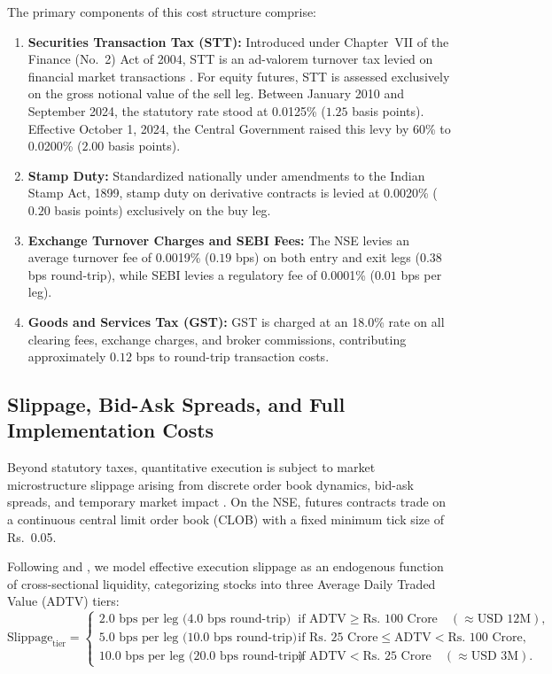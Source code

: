\documentclass[11pt,a4paper]{article}
\begin{document}
The primary components of this cost structure comprise:
\begin{enumerate}
    \item \textbf{Securities Transaction Tax (STT):} Introduced under Chapter~VII of the Finance (No.~2) Act of 2004, STT is an ad-valorem turnover tax levied on financial market transactions \citep{bose2007securities}. For equity futures, STT is assessed exclusively on the gross notional value of the sell leg. Between January 2010 and September 2024, the statutory rate stood at 0.0125\% ($1.25$ basis points). Effective October 1, 2024, the Central Government raised this levy by 60\% to 0.0200\% ($2.00$ basis points).
    \item \textbf{Stamp Duty:} Standardized nationally under amendments to the Indian Stamp Act, 1899, stamp duty on derivative contracts is levied at 0.0020\% ($0.20$ basis points) exclusively on the buy leg.
    \item \textbf{Exchange Turnover Charges and SEBI Fees:} The NSE levies an average turnover fee of 0.0019\% ($0.19$ bps) on both entry and exit legs ($0.38$ bps round-trip), while SEBI levies a regulatory fee of 0.0001\% ($0.01$ bps per leg).
    \item \textbf{Goods and Services Tax (GST):} GST is charged at an 18.0\% rate on all clearing fees, exchange charges, and broker commissions, contributing approximately $0.12$ bps to round-trip transaction costs.
\end{enumerate}

\subsection{Slippage, Bid-Ask Spreads, and Full Implementation Costs}
Beyond statutory taxes, quantitative execution is subject to market microstructure slippage arising from discrete order book dynamics, bid-ask spreads, and temporary market impact \citep{roll1984simple,amihud2002illiquidity,almgren2000optimal}. On the NSE, futures contracts trade on a continuous central limit order book (CLOB) with a fixed minimum tick size of Rs.~0.05.

Following \citet{frazzini2018trading} and \citet{novymarx2016taxonomy}, we model effective execution slippage as an endogenous function of cross-sectional liquidity, categorizing stocks into three Average Daily Traded Value (ADTV) tiers:
\begin{equation}
    \text{Slippage}_{\text{tier}} = \begin{cases}
        2.0 \text{ bps per leg (}4.0\text{ bps round-trip)} & \text{if ADTV} \ge \text{Rs.~100 Crore} \quad (\approx \text{USD 12M}), \\
        5.0 \text{ bps per leg (}10.0\text{ bps round-trip)} & \text{if Rs.~25 Crore} \le \text{ADTV} < \text{Rs.~100 Crore}, \\
        10.0 \text{ bps per leg (}20.0\text{ bps round-trip)} & \text{if ADTV} < \text{Rs.~25 Crore} \quad (\approx \text{USD 3M}).
    \end{cases}
    \label{eq:slippage_tiers}
\end{equation}
\end{document}

